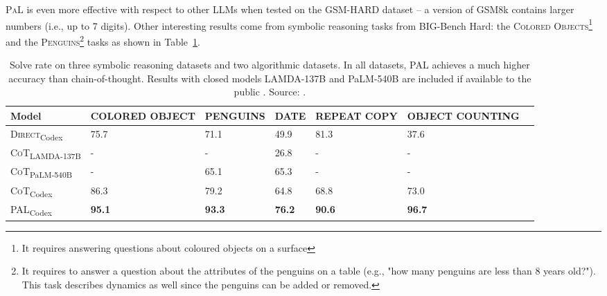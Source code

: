 \textsc{PaL} is even more effective with respect to other LLMs when tested on the GSM-HARD dataset -- a version of GSM8k contains larger numbers (i.e., up to 7 digits).
Other interesting results come from symbolic reasoning tasks from BIG-Bench Hard: the \textsc{Colored Objects}\footnote{It requires answering questions about coloured objects on a surface} and the \textsc{Penguins}\footnote{It requires to answer a question about the attributes of the penguins on a table (e.g., "how many penguins are less than 8 years old?"). This task describes dynamics as well since the penguins can be added or removed.} tasks as shown in Table~\ref{tab:pal-symbolic}.
\begin{table}[h!]
	\centering
	\small
	\begin{tabularx}{\textwidth}{XXXXXXX}
		\hline
		\textbf{Model}                         & \textbf{COLORED                                                                 \newline OBJECT} & \textbf{PENGUINS} & \textbf{DATE} & \textbf{REPEAT \newline COPY} & \textbf{OBJECT COUNTING} \\ \hline
		\textsc{Direct}\textsubscript{Codex}   & 75.7                                                                                             & 71.1              & 49.9          & 81.3                          & 37.6                     \\
		\textsc{CoT}\textsubscript{LAMDA-137B} & -                                                                                                & -                 & 26.8          & -                             & -                        \\
		\textsc{CoT}\textsubscript{PaLM-540B}  & -                                                                                                & 65.1              & 65.3          & -                             & -                        \\
		\textsc{CoT}\textsubscript{Codex}      & 86.3                                                                                             & 79.2              & 64.8          & 68.8                          & 73.0                     \\
		\textsc{PAL}\textsubscript{Codex}      & \textbf{95.1}                                                                                    & \textbf{93.3}     & \textbf{76.2} & \textbf{90.6}                 & \textbf{96.7}            \\ \hline
	\end{tabularx}
	\caption{Solve rate on three symbolic reasoning datasets and two algorithmic datasets. In all datasets, PAL achieves a much higher accuracy than chain-of-thought. Results with closed models LAMDA-137B and PaLM-540B are included if available to the public \textcite{wei2022chain, suzgun2022challenging}. Source: \textcite{gao2022pal}.}
	\label{tab:pal-symbolic}
\end{table}
